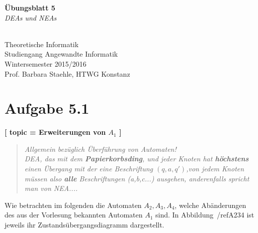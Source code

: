 \documentclass[12pt]{article}
\begin{document}
  
\begin{center}
\begin{huge}
\textbf{Übungsblatt 5}\\
\textit{DEAs und NEAs}
\end{huge} \\

Theoretische Informatik\\
Studiengang Angewandte Informatik\\
Wintersemester 2015/2016\\
Prof. Barbara Staehle, HTWG Konstanz
\end{center}

\section*{Aufgabe 5.1}
\textbf{[ 
 topic = Erweiterungen von $A_1$ 
 ] }
 \begin{quote}
  \textit{Allgemein bezüglich Überführung von Automaten! \\
   DEA, das mit dem \textbf{Papierkorbsding}, und jeder Knoten hat \textbf{höchstens} einen Übergang mit der eine Beschriftung $(q,a,q')$,von jedem Knoten müssen also \textbf{alle} Beschriftungen (a,b,c...) ausgehen, anderenfalls spricht man von NEA.... }
  
 \end{quote}
 
 Wie betrachten im folgenden die Automaten $A_2,A_3,A_4$, welche Abänderungen des aus der Vorlesung bekannten Automaten $A_1$ sind. In Abbildung~/ref{A234} ist jeweils ihr Zustandsübergangsdiagramm dargestellt.  
  
\end{document}
